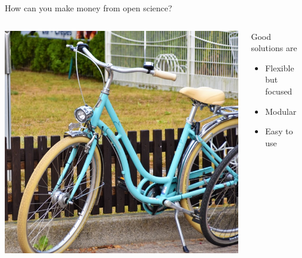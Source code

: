 \begin{frame}{How can you make money from open science?}

\begin{columns}[c]

    \begin{column}{0.45\textwidth}
        \includegraphics[width=\textwidth]{images/waldemar-brandt-_FiK8jopQh8-unsplash.jpg}
        \pause
    \end{column}
    
    \begin{column}{0.45\textwidth}
        Good solutions are
        \begin{itemize}
            \item Flexible but focused
            \item Modular
            \item Easy to use
        \end{itemize}
    \end{column}
    
\end{columns}

\end{frame}
